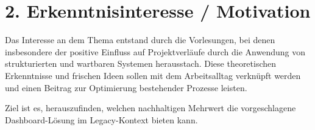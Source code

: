 \section*{2. Erkenntnisinteresse / Motivation}
Das Interesse an dem Thema entstand durch die Vorlesungen, bei denen insbesondere der positive Einfluss auf Projektverläufe durch die Anwendung von strukturierten und wartbaren Systemen herausstach. Diese theoretischen Erkenntnisse und frischen Ideen sollen mit dem Arbeitsalltag verknüpft werden und einen Beitrag zur Optimierung bestehender Prozesse leisten.

Ziel ist es, herauszufinden, welchen nachhaltigen Mehrwert die vorgeschlagene Dashboard-Lösung im Legacy-Kontext bieten kann.
